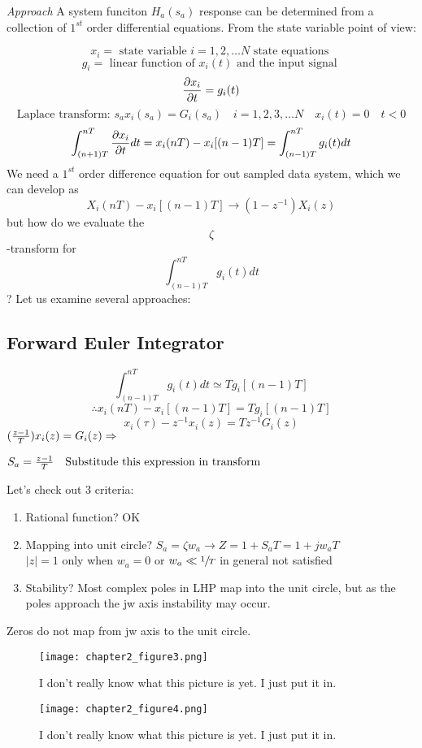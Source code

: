\documentclass[11pt,fleqn]{book} %
\begin{document}
\textit{Approach}
A system funciton $H_a(s_a)$ response can be determined from a collection of $1^{st}$ order differential equations. From the state variable point of view:

$$x_i=\text{ state variable }i = 1, 2, \dots N \text{ state equations }$$
$$g_i = \text{ linear function of }x_i(t) \text{ and the input signal }$$
$${\partial x_i\over \partial t}=g_i(t)$$
$$\text{Laplace transform: }s_ax_i(s_a)=G_i(s_a)\quad i=1,2,3,\dots N\quad x_i(t)=0\quad t<0$$
$$\int_{(n+1)T}^{nT}{\partial x_i\over\partial t} dt=x_i(nT)-x_i[(n-1)T]=\int_{(n-1)T}^{nT}g_i(t)dt$$
We need a $1^{st}$ order difference equation for out sampled data system, which we can develop as
$$X_i(nT)-x_i[(n-1)T]\to(1-z^{-1})X_i(z)$$
but how do we evaluate the $$\zeta$$-transform for $$\int_{(n-1)T}^{nT}g_i(t)dt$$?
Let us examine several approaches:

\subsection{Forward Euler Integrator}

$$\int_{(n-1)T}^{nT}g_i(t)dt\simeq Tg_i[(n-1)T]$$
$$\therefore x_i(nT)-x_i[(n-1)T]=Tg_i[(n-1)T]$$
$$x_i(\tau)-z^{-1}x_i(z)=Tz^{-1}G_i(z)$$
$({z-1\over T})x_i(z)=G_i(z)\Rightarrow$
\begin{tcolorbox}
  ${S_a={z-1\over T}\quad\text{Substitude this expression in transform}}$
\end{tcolorbox}

Let's check out 3 criteria:

\begin{enumerate}
  \item Rational function? OK
  \item Mapping into unit circle? $S_a=\zeta w_a\to Z=1+S_aT=1+jw_aT$\\
  $|z|=1$ only when $w_a=0$ or $w_a\ll\sfrac{1}{T}$ in general not satisfied
  \item Stability? Most complex poles in LHP map into the unit circle, but as the poles approach the jw axis instability may occur.
\end{enumerate}
Zeros do not map from jw axis to the unit circle.

\begin{figure}[h]
  \centering\texttt{[image: chapter2\_figure3.png]}
  \caption{I don't really know what this picture is yet. I just put it in.}
\end{figure}

\begin{figure}[h]
  \centering\texttt{[image: chapter2\_figure4.png]}
  \caption{I don't really know what this picture is yet. I just put it in.}
\end{figure}
\end{document}
